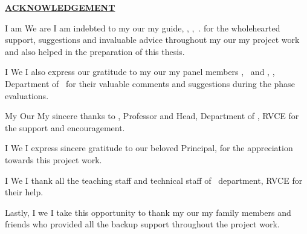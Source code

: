 \thispagestyle{empty}

\begin{center}
\Large\textbf{\underline{ACKNOWLEDGEMENT}} \par
\end{center}

\ifPG I am \else
\ifStuNameBUsed We are \else I am \fi\fi indebted to \ifPG my \else\ifStuNameBUsed our \else my \fi\fi guide, \textbf{\printGuideNameA}, \printGuideDesigA, \printGuideOrgA$\,.$ for the wholehearted support, suggestions and invaluable advice throughout \ifPG my \else\ifStuNameBUsed our \else my \fi\fi project work and also helped in the preparation of this thesis.\\ \par

\ifPG I \else \ifStuNameBUsed We \else I \fi\fi also express our gratitude to \ifPG my \else\ifStuNameBUsed our \else my \fi\fi  panel members \textbf{\printPanelMemberA}, \printPanelMemberDesigA $\,$ and \textbf{\printPanelMemberB}, \printPanelMemberDesigB , Department of \printDepartmentLF\, for their valuable comments and suggestions during the phase evaluations. \\ \par

\ifPG My \else \ifStuNameBUsed Our \else My \fi\fi sincere thanks to \textbf{\printHOD}, Professor and Head, Department of \printDepartmentLF, RVCE for the support and encouragement.\\ \par

\ifPG I \else \ifStuNameBUsed We \else I \fi\fi express sincere gratitude to our beloved Principal, \textbf{\printPrincipal} for the appreciation towards this project work.\\ \par

\ifPG I \else\ifStuNameBUsed We \else I \fi\fi thank all the teaching staff and technical staff of \printDepartmentLF\, department, RVCE for their help.\\ \par 

Lastly, \ifPG I \else\ifStuNameBUsed we \else I \fi\fi take this opportunity to thank \ifPG my \else\ifStuNameBUsed our \else my \fi\fi family members and friends who provided all the backup support throughout the project work.\\ \par

